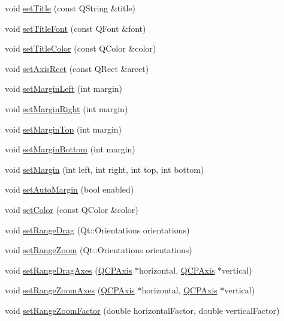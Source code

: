 \begin{DoxyCompactItemize}
\item 
void \hyperlink{classQCustomPlot_a84257c1e1f984b3932245069428f3176}{set\-Title} (const Q\-String \&title)
\item 
void \hyperlink{classQCustomPlot_ae104d89b683a6ec6831c4b7b02530f15}{set\-Title\-Font} (const Q\-Font \&font)
\item 
void \hyperlink{classQCustomPlot_a57693e1334130e47dae06f8bd226328b}{set\-Title\-Color} (const Q\-Color \&color)
\item 
void \hyperlink{classQCustomPlot_af3aa7b8716f40aa6103a40ff39d4f4c7}{set\-Axis\-Rect} (const Q\-Rect \&arect)
\item 
void \hyperlink{classQCustomPlot_aea4504b33a3d8942cdda8f9d5b09e740}{set\-Margin\-Left} (int margin)
\item 
void \hyperlink{classQCustomPlot_ae9e626fab11ba17b8f41d95e08c94bc6}{set\-Margin\-Right} (int margin)
\item 
void \hyperlink{classQCustomPlot_a215cbdd970d1ccda039418c6742f93b3}{set\-Margin\-Top} (int margin)
\item 
void \hyperlink{classQCustomPlot_a3f6c9663a3bc1e5b3d99ff237fde4662}{set\-Margin\-Bottom} (int margin)
\item 
void \hyperlink{classQCustomPlot_a990cbcb1da0cc93ebb06ceea7366c129}{set\-Margin} (int left, int right, int top, int bottom)
\item 
void \hyperlink{classQCustomPlot_aed5bb30c9b04c1d0103ab8ef7190f23a}{set\-Auto\-Margin} (bool enabled)
\item 
void \hyperlink{classQCustomPlot_a900feeb82a58f3594b8bb367571c17c8}{set\-Color} (const Q\-Color \&color)
\item 
void \hyperlink{classQCustomPlot_aa0e1c44295da2706d0f12ad48f64b806}{set\-Range\-Drag} (Qt\-::\-Orientations orientations)
\item 
void \hyperlink{classQCustomPlot_ad4a0919e471549a2daea517ce6538ad8}{set\-Range\-Zoom} (Qt\-::\-Orientations orientations)
\item 
void \hyperlink{classQCustomPlot_a9fa10e826a174884391c1c839d52c0a3}{set\-Range\-Drag\-Axes} (\hyperlink{classQCPAxis}{Q\-C\-P\-Axis} $\ast$horizontal, \hyperlink{classQCPAxis}{Q\-C\-P\-Axis} $\ast$vertical)
\item 
void \hyperlink{classQCustomPlot_a9808f1736b8116c116bcccb53cdb210a}{set\-Range\-Zoom\-Axes} (\hyperlink{classQCPAxis}{Q\-C\-P\-Axis} $\ast$horizontal, \hyperlink{classQCPAxis}{Q\-C\-P\-Axis} $\ast$vertical)
\item 
void \hyperlink{classQCustomPlot_ab0589ec79b1081b13ffb7cf5791a8735}{set\-Range\-Zoom\-Factor} (double horizontal\-Factor, double vertical\-Factor)

\end{DoxyCompactItemize}

